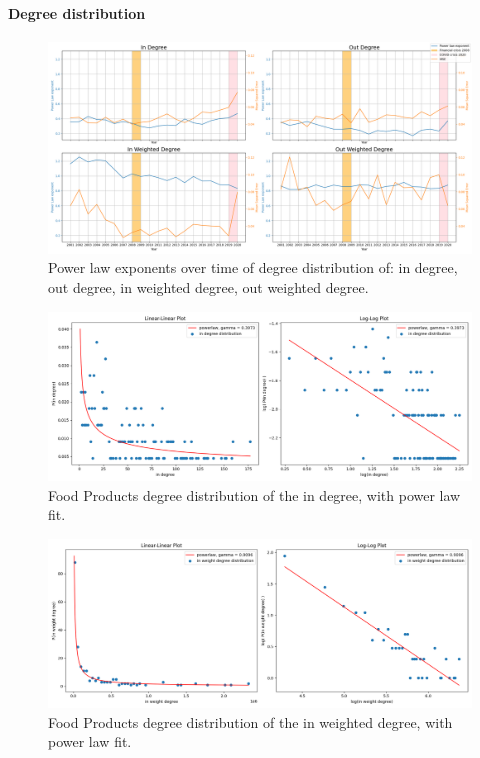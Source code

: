 \paragraph{Degree distribution}

\begin{figure}
    \centering
    \includegraphics[width=\textwidth]{pics/ts_p10.png}
    \caption{Power law exponents over time of degree distribution of: in degree, out degree, in weighted degree, out weighted degree.}
    \label{fig:fooddegree}
\end{figure}


\begin{figure}
    \centering
    \includegraphics[width=\textwidth]{pics/powerlaw_in_degree_p10_y2014.png}
    \caption{Food Products degree distribution of the in degree, with power law fit.}
    \label{fig:plfood}
\end{figure}


\begin{figure}
    \centering
    \includegraphics[width=\textwidth]{pics/powerlaw_in_weight_degree_p10_y2014.png}
    \caption{Food Products degree distribution of the in weighted degree, with power law fit.}
    \label{fig:plfoodw}
\end{figure}

